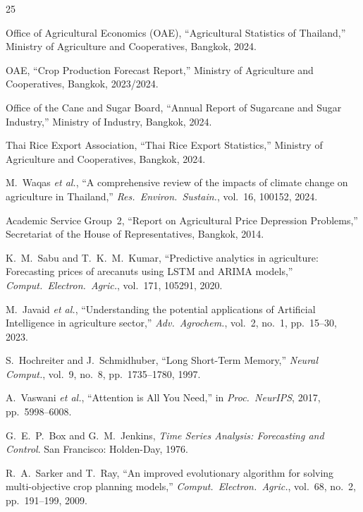\documentclass[journal]{IEEEtran}
\begin{document}
\balance
\begin{thebibliography}{25}

Office of Agricultural Economics (OAE), ``Agricultural Statistics of Thailand,'' Ministry of Agriculture and Cooperatives, Bangkok, 2024.

OAE, ``Crop Production Forecast Report,'' Ministry of Agriculture and Cooperatives, Bangkok, 2023/2024.

Office of the Cane and Sugar Board, ``Annual Report of Sugarcane and Sugar Industry,'' Ministry of Industry, Bangkok, 2024.

Thai Rice Export Association, ``Thai Rice Export Statistics,'' Ministry of Agriculture and Cooperatives, Bangkok, 2024.

M.~Waqas \textit{et al.}, ``A comprehensive review of the impacts of climate change on agriculture in Thailand,'' \textit{Res.\ Environ.\ Sustain.}, vol.~16, 100152, 2024.

Academic Service Group~2, ``Report on Agricultural Price Depression Problems,'' Secretariat of the House of Representatives, Bangkok, 2014.

K.~M.~Sabu and T.~K.~M.~Kumar, ``Predictive analytics in agriculture: Forecasting prices of arecanuts using LSTM and ARIMA models,'' \textit{Comput.\ Electron.\ Agric.}, vol.~171, 105291, 2020.

M.~Javaid \textit{et al.}, ``Understanding the potential applications of Artificial Intelligence in agriculture sector,'' \textit{Adv.\ Agrochem.}, vol.~2, no.~1, pp.~15--30, 2023.

S.~Hochreiter and J.~Schmidhuber, ``Long Short-Term Memory,'' \textit{Neural Comput.}, vol.~9, no.~8, pp.~1735--1780, 1997.

A.~Vaswani \textit{et al.}, ``Attention is All You Need,'' in \textit{Proc.\ NeurIPS}, 2017, pp.~5998--6008.

G.~E.~P.~Box and G.~M.~Jenkins, \textit{Time Series Analysis: Forecasting and Control}. San Francisco: Holden-Day, 1976.

R.~A.~Sarker and T.~Ray, ``An improved evolutionary algorithm for solving multi-objective crop planning models,'' \textit{Comput.\ Electron.\ Agric.}, vol.~68, no.~2, pp.~191--199, 2009.


\end{thebibliography}
\end{document}
